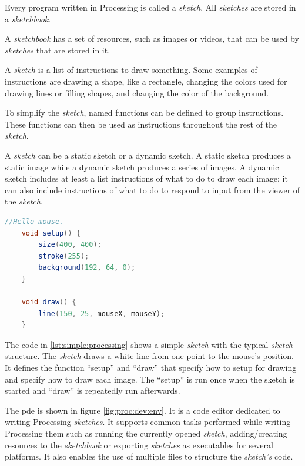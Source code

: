 \documentclass{./llncs2e/llncs}
\begin{document}
	Every program written in Processing is called a \emph{sketch}. All \emph{sketches} are stored in a \emph{sketchbook}.

	A \emph{sketchbook} has a set of resources, such as images or videos, that can be used by \emph{sketches} that are stored in it.

	A \emph{sketch} is a list of instructions to draw something. Some examples of instructions are drawing a shape, like a rectangle, changing the colors used for drawing lines or filling shapes, and changing the color of the background.

	To simplify the \emph{sketch}, named functions can be defined to group instructions. These functions can then be used as instructions throughout the rest of the \emph{sketch}.

	A \emph{sketch} can be a static sketch or a dynamic sketch. A static sketch produces a static image while a dynamic sketch produces a series of images. A dynamic sketch includes at least a list instructions of what to do to draw each image; it can also include instructions of what to do to respond to input from the viewer of the \emph{sketch}.

	\begin{lstlisting}[caption={A simple Processing sketch},label={lst:simple:processing},language=Java]
	//Hello mouse.
	void setup() {
	    size(400, 400);
	    stroke(255);
	    background(192, 64, 0);
	}
	 
	void draw() {
	    line(150, 25, mouseX, mouseY);
	}
	\end{lstlisting}

	The code in \ref{lst:simple:processing} shows a simple \emph{sketch} with the typical \emph{sketch} structure. The \emph{sketch} draws a white line from one point to the mouse's position. It defines the function ``setup'' and  ``draw'' that specify how to setup for drawing and specify how to draw each image. The ``setup'' is run once when the sketch is started and ``draw'' is repeatedly run afterwards.

	The \ac{pde} is shown in figure \ref{fig:proc:dev:env}. It is a code editor dedicated to writing Processing \emph{sketches}. It supports common tasks performed while writing Processing them such as running the currently opened \emph{sketch}, adding/creating resources to the \emph{sketchbook} or exporting \emph{sketches} as executables for several platforms. It also enables the use of multiple files to structure the \emph{sketch's} code.
\end{document}
